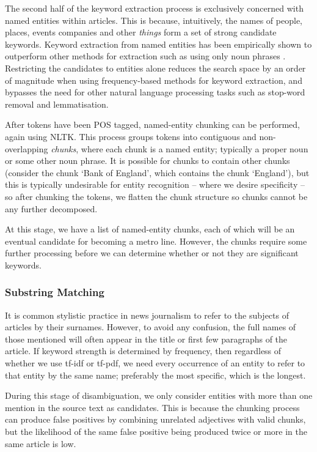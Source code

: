 The second half of the keyword extraction process is exclusively concerned with named entities within articles. This is because, intuitively, the names of people, places, events companies and other \textit{things} form a set of strong candidate keywords. Keyword extraction from named entities has been empirically shown to outperform other methods for extraction such as using only noun phrases \citep{EventTracking}.  Restricting the candidates to entities alone reduces the search space by an order of magnitude when using frequency-based methods for keyword extraction, and bypasses the need for other natural language processing tasks such as stop-word removal and lemmatisation.

After tokens have been POS tagged, named-entity chunking can be performed, again using NLTK. This process groups tokens into contiguous and non-overlapping \textit{chunks}, where each chunk is a named entity; typically a proper noun or some other noun phrase. It is possible for chunks to contain other chunks (consider the chunk `Bank of England', which contains the chunk `England'), but this is typically undesirable for entity recognition -- where we desire specificity -- so after chunking the tokens, we flatten the chunk structure so chunks cannot be any further decomposed.

At this stage, we have a list of named-entity chunks, each of which will be an eventual candidate for becoming a metro line. However, the chunks require some further processing before we can determine whether or not they are significant keywords.

\subsubsection{Substring Matching}
It is common stylistic practice in news journalism to refer to the subjects of articles by their surnames. However, to avoid any confusion, the full names of those mentioned will often appear in the title or first few paragraphs of the article. If keyword strength is determined by frequency, then regardless of whether we use tf-idf or tf-pdf, we need every occurrence of an entity to refer to that entity by the same name; preferably the most specific, which is the longest.

During this stage of disambiguation, we only consider entities with more than one mention in the source text as candidates. This is because the chunking process can produce false positives by combining unrelated adjectives with valid chunks, but the likelihood of the same false positive being produced twice or more in the same article is low.

